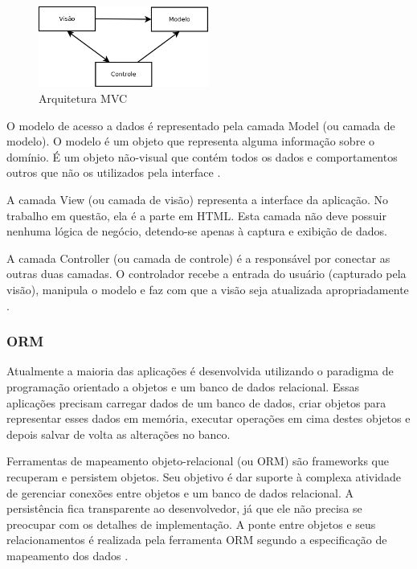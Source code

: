 \begin{figure}[htbp]
\centering
\includegraphics[width=0.5\textwidth]{fig/diagrama_mvc.png}
\caption{Arquitetura MVC}
\label{fig:diag_mvc}
\end{figure}

O modelo de acesso a dados é representado pela camada Model (ou camada de modelo). O modelo 
é um objeto que representa alguma informação sobre o domínio. É um objeto não-visual 
que contém todos os dados e comportamentos outros que não os utilizados 
pela interface \cite{Fowler:2006}.

A camada View (ou camada de visão) representa a interface da aplicação. No trabalho
em questão, ela é a parte em HTML. Esta camada não deve possuir nenhuma lógica de negócio,
detendo-se apenas à captura e exibição de dados.

A camada Controller (ou camada de controle) é a responsável por conectar as outras duas
camadas. O controlador recebe a entrada do usuário (capturado pela visão), manipula o 
modelo e faz com que a visão seja atualizada apropriadamente \cite{Fowler:2006}.

\subsubsection{ORM}
Atualmente a maioria das aplicações é desenvolvida utilizando o paradigma de programação 
orientado a objetos e um banco de dados relacional. Essas aplicações precisam carregar
dados de um banco de dados, criar objetos para representar esses dados em memória,
executar operações em cima destes objetos e depois salvar de volta as alterações no banco.

Ferramentas de mapeamento objeto-relacional (ou ORM) são frameworks que recuperam e persistem
objetos. Seu objetivo é dar suporte à complexa atividade de gerenciar conexões entre
objetos e um banco de dados relacional. A persistência fica transparente ao desenvolvedor,
já que ele não precisa se preocupar com os detalhes de implementação. A ponte entre
objetos e seus relacionamentos é realizada pela ferramenta ORM segundo a especificação 
de mapeamento dos dados \cite{springerlink}.

